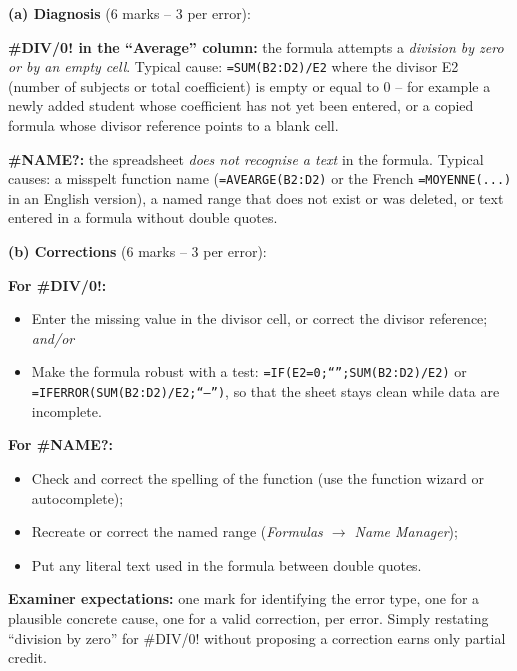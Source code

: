 \documentclass[11pt]{article}
\begin{document}
\begin{corrige}
\textbf{(a) Diagnosis} (6 marks -- 3 per error):

\textbf{\#DIV/0! in the ``Average'' column:} the formula attempts a \emph{division by zero or by an empty cell}. Typical cause: \texttt{=SUM(B2:D2)/E2} where the divisor E2 (number of subjects or total coefficient) is empty or equal to 0 -- for example a newly added student whose coefficient has not yet been entered, or a copied formula whose divisor reference points to a blank cell.

\textbf{\#NAME?:} the spreadsheet \emph{does not recognise a text} in the formula. Typical causes: a misspelt function name (\texttt{=AVEARGE(B2:D2)} or the French \texttt{=MOYENNE(...)} in an English version), a named range that does not exist or was deleted, or text entered in a formula without double quotes.

\textbf{(b) Corrections} (6 marks -- 3 per error):

\textbf{For \#DIV/0!:}
\begin{itemize}
\item Enter the missing value in the divisor cell, or correct the divisor reference; \emph{and/or}
\item Make the formula robust with a test: \texttt{=IF(E2=0;``'';SUM(B2:D2)/E2)} or \texttt{=IFERROR(SUM(B2:D2)/E2;``--'')}, so that the sheet stays clean while data are incomplete.
\end{itemize}

\textbf{For \#NAME?:}
\begin{itemize}
\item Check and correct the spelling of the function (use the function wizard or autocomplete);
\item Recreate or correct the named range (\emph{Formulas $\rightarrow$ Name Manager});
\item Put any literal text used in the formula between double quotes.
\end{itemize}

\textbf{Examiner expectations:} one mark for identifying the error type, one for a plausible concrete cause, one for a valid correction, per error. Simply restating ``division by zero'' for \#DIV/0! without proposing a correction earns only partial credit.
\end{corrige}
\end{document}
